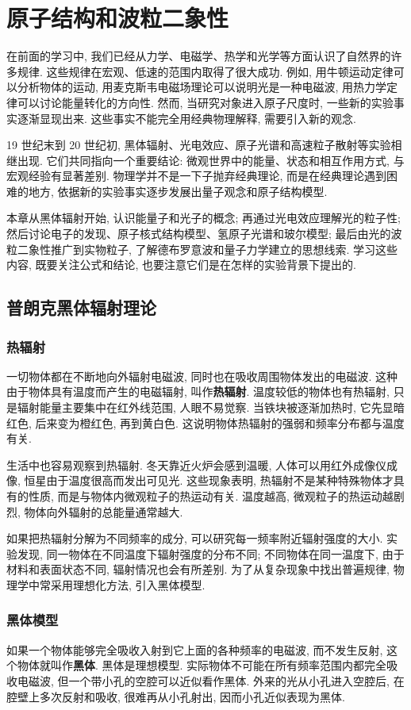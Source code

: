 \documentclass[UTF8,openany,fontset=fandol]{ctexbook}
\theoremstyle{chinesetextbook}
\begin{document}
\chapter{原子结构和波粒二象性}
在前面的学习中, 我们已经从力学、电磁学、热学和光学等方面认识了自然界的许多规律. 这些规律在宏观、低速的范围内取得了很大成功. 例如, 用牛顿运动定律可以分析物体的运动, 用麦克斯韦电磁场理论可以说明光是一种电磁波, 用热力学定律可以讨论能量转化的方向性. 然而, 当研究对象进入原子尺度时, 一些新的实验事实逐渐显现出来. 这些事实不能完全用经典物理解释, 需要引入新的观念.

19 世纪末到 20 世纪初, 黑体辐射、光电效应、原子光谱和高速粒子散射等实验相继出现. 它们共同指向一个重要结论: 微观世界中的能量、状态和相互作用方式, 与宏观经验有显著差别. 物理学并不是一下子抛弃经典理论, 而是在经典理论遇到困难的地方, 依据新的实验事实逐步发展出量子观念和原子结构模型.

本章从黑体辐射开始, 认识能量子和光子的概念; 再通过光电效应理解光的粒子性; 然后讨论电子的发现、原子核式结构模型、氢原子光谱和玻尔模型; 最后由光的波粒二象性推广到实物粒子, 了解德布罗意波和量子力学建立的思想线索. 学习这些内容, 既要关注公式和结论, 也要注意它们是在怎样的实验背景下提出的.
\section{普朗克黑体辐射理论}
\subsection{热辐射}
一切物体都在不断地向外辐射电磁波, 同时也在吸收周围物体发出的电磁波. 这种由于物体具有温度而产生的电磁辐射, 叫作\textbf{热辐射}. 温度较低的物体也有热辐射, 只是辐射能量主要集中在红外线范围, 人眼不易觉察. 当铁块被逐渐加热时, 它先显暗红色, 后来变为橙红色, 再到黄白色. 这说明物体热辐射的强弱和频率分布都与温度有关.

生活中也容易观察到热辐射. 冬天靠近火炉会感到温暖, 人体可以用红外成像仪成像, 恒星由于温度很高而发出可见光. 这些现象表明, 热辐射不是某种特殊物体才具有的性质, 而是与物体内微观粒子的热运动有关. 温度越高, 微观粒子的热运动越剧烈, 物体向外辐射的总能量通常越大.

如果把热辐射分解为不同频率的成分, 可以研究每一频率附近辐射强度的大小. 实验发现, 同一物体在不同温度下辐射强度的分布不同; 不同物体在同一温度下, 由于材料和表面状态不同, 辐射情况也会有所差别. 为了从复杂现象中找出普遍规律, 物理学中常采用理想化方法, 引入黑体模型.
\subsection{黑体模型}
如果一个物体能够完全吸收入射到它上面的各种频率的电磁波, 而不发生反射, 这个物体就叫作\textbf{黑体}. 黑体是理想模型. 实际物体不可能在所有频率范围内都完全吸收电磁波, 但一个带小孔的空腔可以近似看作黑体. 外来的光从小孔进入空腔后, 在腔壁上多次反射和吸收, 很难再从小孔射出, 因而小孔近似表现为黑体.
\end{document}

